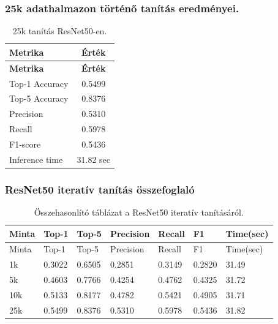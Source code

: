       \subsubsection{25k adathalmazon történő tanítás eredményei.}
        \begin{center}
          \begin{longtable}{l c}
          \caption{25k tanítás ResNet50-en.} \label{tab:phase03_ResNet50_25k} \\
          \toprule
          \textbf{Metrika} & \textbf{Érték} \\
          \midrule
          \endfirsthead
          \toprule
          \textbf{Metrika} & \textbf{Érték} \\
          \midrule
          \endhead
          Top-1 Accuracy & 0.5499 \\
          Top-5 Accuracy & 0.8376 \\
          Precision      & 0.5310 \\
          Recall         & 0.5978 \\
          F1-score       & 0.5436 \\
          Inference time & 31.82 sec \\
          \bottomrule
          \end{longtable}
        \end{center}
      
      \subsubsection{ResNet50 iteratív tanítás összefoglaló}
        \begin{center}
          \begin{longtable}{lllllll}
          \caption{Összehasonlító táblázat a ResNet50 iteratív tanításáról.}\label{tab:phase3_ResNet50_summary_table}\\
          \toprule
          Minta & Top-1 & Top-5 & Precision & Recall & F1 & Time(sec) \\
          \midrule
          \endfirsthead
          \toprule
          Minta & Top-1 & Top-5 & Precision & Recall & F1 & Time(sec) \\
          \midrule
          \endhead
          1k & 0.3022 & 0.6505 & 0.2851 & 0.3149 & 0.2820 & 31.49 \\
          5k & 0.4603 & 0.7766 & 0.4254 & 0.4762 & 0.4325 & 31.72 \\
          10k & 0.5133 & 0.8177 & 0.4782 & 0.5421 & 0.4905 & 31.71 \\
          25k & 0.5499 & 0.8376 & 0.5310 & 0.5978 & 0.5436 & 31.82 \\
          \bottomrule
          \end{longtable}
        \end{center}
      
